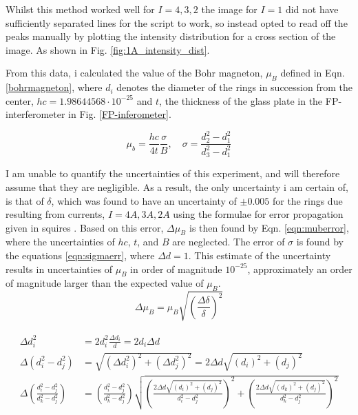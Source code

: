 \documentclass[11pt,a4paper]{article}
\begin{document}
      Whilst this method worked well for $I = 4, 3, 2$ the image for $I=1$ did not have sufficiently separated lines for the script to work, so instead opted to read off the peaks manually by plotting the intensity distribution for a cross section of the image. As shown in Fig. \ref{fig:1A_intensity_dist}.

      From this data, i calculated the value of the Bohr magneton, $\mu_B$ defined in Eqn. \ref{bohrmagneton}, where $d_i$ denotes the diameter of the rings in succession from the center, $hc = 1.98644568\cdot10^{-25}$ and $t$, the thickness of the glass plate in the FP-interferometer in Fig. \ref{FP-inferometer}.

      \begin{equation}
        \mu_b = \frac{hc}{4t} \frac{\sigma}{B},\quad \sigma = \frac{d_2^2 - d_1^2}{d_3^2 - d_1^2}
        \label{bohrmagneton}
      \end{equation}

      I am unable to quantify the uncertainties of this experiment, and will therefore assume that they are negligible. As a result, the only uncertainty i am certain of, is that of $\delta$, which was found to have an uncertainty of $\pm 0.005$ for the rings due resulting from currents, $I=4A, 3A, 2A$ using the formulae for error propagation given in squires \cite{squires_practical_2001}. Based on this error, $\Delta \mu_B$ is then found by Eqn. \ref{eqn:muberror}, where the uncertainties of $hc$, $t$, and $B$ are neglected. The error of $\sigma$ is found by the equations \ref{eqn:sigmaerr}, where $\Delta d =1$. This estimate of the uncertainty results in uncertainties of $\mu_B$ in order of magnitude $10^{-25}$, approximately an order of magnitude larger than the expected value of $\mu_B$.
      \begin{equation}
        \Delta \mu_B = \mu_B \sqrt{\left(\frac{\Delta \delta}{\delta}\right)^2}
        \label{eqn:muberror}
      \end{equation}

      \begin{align}
         \begin{split}
           \Delta d_i^2 &= 2d_i^2\frac{\Delta d_i}{d} = 2d_i\Delta d \\
           \Delta (d_i^2 - d_j^2 ) &= \sqrt{(\Delta d_i^2)^2 + (\Delta d_j^2)^2} = 2\Delta d\sqrt{(d_i)^2 + (d_j)^2} \\
           \Delta\left(\frac{d_i^2 - d_j^2}{d_k^2 - d_j^2}\right) &=
           \left(\frac{d_i^2 - d_j^2}{d_k^2 - d_j^2}\right) 
           \sqrt{ 
            \left(
            \frac{2\Delta d\sqrt{(d_i)^2 + (d_j)^2}}{d_i^2 - d_j^2}
            \right)^2 + 
            \left(
            \frac{2\Delta d\sqrt{(d_k)^2 + (d_j)^2}}{d_k^2 - d_j^2}
            \right)^2 
            }
         \end{split}
         \label{eqn:sigmaerr}
     \end{align} 
\end{document}
